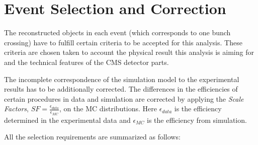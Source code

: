 \section{Event Selection and Correction}\label{sec:sel}

The reconstructed objects in each event (which corresponds to one bunch crossing) have to fulfill certain criteria to be accepted for this analysis. These 
criteria are chosen taken to account the physical result this analysis is aiming for and the technical features of the CMS detector parts.

The incomplete correspondence of the simulation model to the experimental results has to be additionally corrected. The differences in the efficiencies 
of certain procedures in data and simulation are corrected by applying the \textit{Scale Factors}, $SF = \frac{\epsilon_{data}}{\epsilon_{MC}}$, 
on the MC distributions. Here $\epsilon_{data}$ is the efficiency determined in the experimental data and $\epsilon_{MC}$ is the efficiency from
simulation. 

All the selection requirements are summarized as follows:

